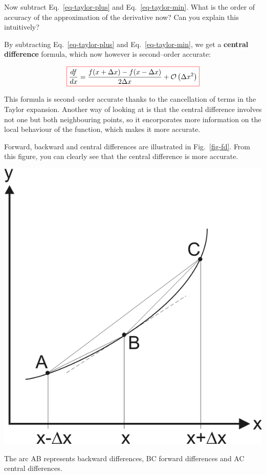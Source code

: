 \begin{cue}
Now subtract Eq.~\ref{eq-taylor-plus} and Eq.~\ref{eq-taylor-min}. What is the order of accuracy of the approximation of the derivative now? Can you explain this intuitively?
\end{cue}

By subtracting Eq.~\ref{eq-taylor-plus} and Eq.~\ref{eq-taylor-min}, we get a \textbf{central difference} formula, which now however is second--order accurate:

\begin{equation}
\fbox{$\displaystyle
\frac{d f}{d x} = \frac{f(x + \Delta x) - f(x- \Delta x)}{2 \Delta x} + \mathcal{O}\left(\Delta x^2\right)
$}
\end{equation} 

This formula is second--order accurate thanks to the cancellation of terms in the Taylor expansion. Another way of looking at is that the central difference involves not one but both neighbouring points, so it encorporates more information on the local behaviour of the function, which makes it more accurate.

Forward, backward and central differences are illustrated in Fig.~\ref{fig-fd}. From this figure, you can clearly see that the central difference is more accurate.

\begin{marginfigure}
\centering
\includegraphics{numeric/figures/fd}
\caption{The arc AB represents backward differences, BC forward differences and AC central differences.}
\label{fig-fd}
\end{marginfigure}

